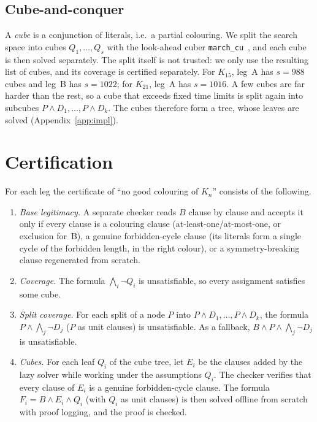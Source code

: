 \documentclass[11pt]{amsart}
\theoremstyle{definition}
\theoremstyle{remark}
\begin{document}
\subsection{Cube-and-conquer}
A \emph{cube} is a conjunction of literals, i.e.\ a partial colouring. We split the search space into cubes $Q_1,\dots,Q_s$ with the
look-ahead cuber \texttt{march\_cu}~\cite{HKWB}, and each cube is then solved separately. The split itself is not trusted: we only
use the resulting list of cubes, and its coverage is certified separately. For $K_{15}$, leg~A has $s=988$ cubes and leg~B has
$s=1022$; for $K_{21}$, leg~A has $s=1016$. A few cubes are far harder than the rest, so a cube that exceeds fixed time limits is
split again into subcubes $P\wedge D_1,\dots,P\wedge D_k$. The cubes therefore form a tree, whose leaves are solved
(Appendix~\ref{app:impl}).

\section{Certification}\label{sec:cert}

For each leg the certificate of ``no good colouring of $K_n$'' consists of the following.
\begin{enumerate}
\item[(C1)] \emph{Base legitimacy.} A separate checker reads $B$ clause by clause and accepts it only if every clause is a colouring
clause (at-least-one/at-most-one, or exclusion for~B), a genuine forbidden-cycle clause (its literals form a single cycle of the
forbidden length, in the right colour), or a symmetry-breaking clause regenerated from scratch.
\item[(C2)] \emph{Coverage.} The formula $\bigwedge_i\neg Q_i$ is unsatisfiable, so every assignment satisfies some cube.
\item[(C2$'$)] \emph{Split coverage.} For each split of a node $P$ into $P\wedge D_1,\dots,P\wedge D_k$, the formula
$P\wedge\bigwedge_j\neg D_j$ ($P$ as unit clauses) is unsatisfiable. As a fallback, $B\wedge P\wedge\bigwedge_j\neg D_j$ is unsatisfiable.
\item[(C3)] \emph{Cubes.} For each leaf $Q_i$ of the cube tree, let $E_i$ be the clauses added by the lazy solver while working under the assumptions $Q_i$.
The checker verifies that every clause of $E_i$ is a genuine forbidden-cycle clause. The formula $F_i=B\wedge E_i\wedge Q_i$ (with $Q_i$
as unit clauses) is then solved offline from scratch with proof logging, and the proof is checked.
\end{enumerate}
\end{document}
